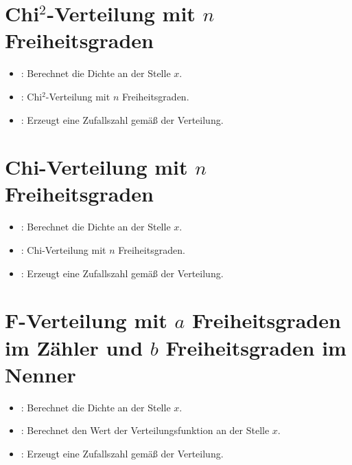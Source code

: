 \section{\texorpdfstring{Chi$^2$}{Chi2}-Verteilung mit \texorpdfstring{$n$}{n} Freiheitsgraden}

\begin{itemize}

\item
{}:
Berechnet die Dichte an der Stelle $x$.

\item
{}:
Chi$^2$-Verteilung mit $n$ Freiheitsgraden.

\item
{}:
Erzeugt eine Zufallszahl gemäß der Verteilung.

\end{itemize}



\section{Chi-Verteilung mit \texorpdfstring{$n$}{n} Freiheitsgraden}

\begin{itemize}

\item
{}:
Berechnet die Dichte an der Stelle $x$.

\item
{}:
Chi-Verteilung mit $n$ Freiheitsgraden.

\item
{}:
Erzeugt eine Zufallszahl gemäß der Verteilung.

\end{itemize}



\section{F-Verteilung mit \texorpdfstring{$a$}{a} Freiheitsgraden im Zähler und \texorpdfstring{$b$}{b} Freiheitsgraden im Nenner}

\begin{itemize}

\item
{}:
Berechnet die Dichte an der Stelle $x$.

\item
{}:
Berechnet den Wert der Verteilungsfunktion an der Stelle $x$.

\item
{}:
Erzeugt eine Zufallszahl gemäß der Verteilung.

\end{itemize}



